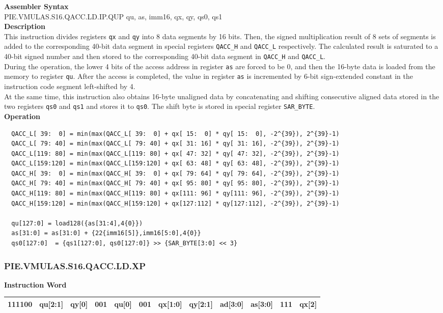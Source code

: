 \textbf{Assembler Syntax} \\
PIE.VMULAS.S16.QACC.LD.IP.QUP qu, as, imm16, qx, qy, qs0, qs1 \\
\textbf{Description} \\
This instruction divides registers \lstinline{qx} and \lstinline{qy} into 8 data segments by 16 bits. Then, the signed multiplication result of 8 sets of segments is added to the corresponding 40-bit data segment in special registers \lstinline{QACC_H} and \lstinline{QACC_L} respectively. The calculated result is saturated to a 40-bit signed number and then stored to the corresponding 40-bit data segment in \lstinline{QACC_H} and \lstinline{QACC_L}.\\
During the operation, the lower 4 bits of the access address in register \lstinline{as} are forced to be 0, and then the 16-byte data is loaded from the memory to register \lstinline{qu}. After the access is completed, the value in register \lstinline{as} is incremented by 6-bit sign-extended constant in the instruction code segment left-shifted by 4.\\
At the same time, this instruction also obtains 16-byte unaligned data by concatenating and shifting consecutive aligned data stored in the two registers \lstinline{qs0} and \lstinline{qs1} and stores it to \lstinline{qs0}. The shift byte is stored in special register \lstinline{SAR_BYTE}.\\
\textbf{Operation}
\begin{lstlisting}
  QACC_L[ 39:  0] = min(max(QACC_L[ 39:  0] + qx[ 15:  0] * qy[ 15:  0], -2^{39}), 2^{39}-1)
  QACC_L[ 79: 40] = min(max(QACC_L[ 79: 40] + qx[ 31: 16] * qy[ 31: 16], -2^{39}), 2^{39}-1)
  QACC_L[119: 80] = min(max(QACC_L[119: 80] + qx[ 47: 32] * qy[ 47: 32], -2^{39}), 2^{39}-1)
  QACC_L[159:120] = min(max(QACC_L[159:120] + qx[ 63: 48] * qy[ 63: 48], -2^{39}), 2^{39}-1)
  QACC_H[ 39:  0] = min(max(QACC_H[ 39:  0] + qx[ 79: 64] * qy[ 79: 64], -2^{39}), 2^{39}-1)
  QACC_H[ 79: 40] = min(max(QACC_H[ 79: 40] + qx[ 95: 80] * qy[ 95: 80], -2^{39}), 2^{39}-1)
  QACC_H[119: 80] = min(max(QACC_H[119: 80] + qx[111: 96] * qy[111: 96], -2^{39}), 2^{39}-1)
  QACC_H[159:120] = min(max(QACC_H[159:120] + qx[127:112] * qy[127:112], -2^{39}), 2^{39}-1)

  qu[127:0] = load128({as[31:4],4{0}})
  as[31:0] = as[31:0] + {22{imm16[5]},imm16[5:0],4{0}}
  qs0[127:0]  = {qs1[127:0], qs0[127:0]} >> {SAR_BYTE[3:0] << 3}
\end{lstlisting}

\newpage
\subsubsection{PIE.VMULAS.S16.QACC.LD.XP}\label{instruction:PIEVMULASS16QACCLDXP}
\setlength\tabcolsep{6pt}
\textbf{Instruction Word} \\
\begin{tabular}{|c|c|c|c|c|c|c|c|c|c|c|c|}
	\hline
	111100 & qu[2:1] & qy[0] & 001 & qu[0] & 001 & qx[1:0] & qy[2:1] & ad[3:0] & as[3:0] & 111 & qx[2] \\
	\hline
\end{tabular}

